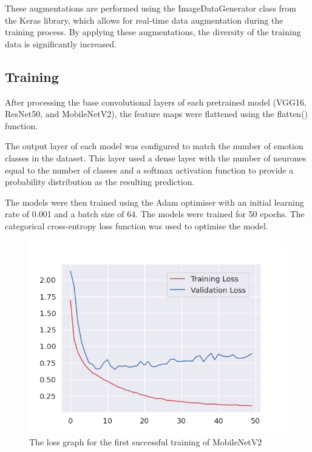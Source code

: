 These augmentations are performed using the ImageDataGenerator class from the Keras library, which allows for real-time data augmentation during the training process. By applying these augmentations, the diversity of the training data is significantly increased.

\subsection{Training}

After processing the base convolutional layers of each pretrained model (VGG16, ResNet50, and MobileNetV2), the feature maps were flattened using the flatten() function.

The output layer of each model was configured to match the number of emotion classes in the dataset. This layer used a dense layer with the number of neurones equal to the number of classes and a softmax activation function to provide a probability distribution as the resulting prediction.

The models were then trained using the Adam optimiser with an initial learning rate of 0.001 and a batch size of 64. The models were trained for 50 epochs. The categorical cross-entropy loss function was used to optimise the model.

\begin{figure}[H]
    \centering{}
    \includegraphics[scale=0.5]{fed_images/train_loss_MobileNetv2.png}
    \caption{The loss graph for the first successful training of MobileNetV2}
    \label{figure:loss_mnv2}
\end{figure}

